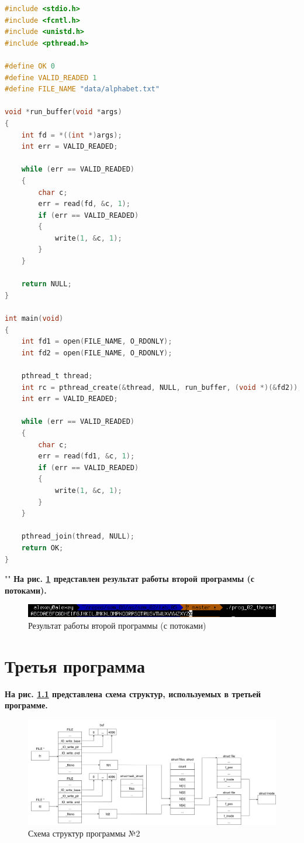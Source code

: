 \documentclass[12pt]{report}
\begin{document}
\begin{lstlisting}[language=c, label=p2thread, caption=Программа №2 (реализация с потоками)]
#include <stdio.h>
#include <fcntl.h>
#include <unistd.h>
#include <pthread.h>

#define OK 0
#define VALID_READED 1
#define FILE_NAME "data/alphabet.txt"

void *run_buffer(void *args)
{
	int fd = *((int *)args);
	int err = VALID_READED;
	
	while (err == VALID_READED)
	{
		char c;
		err = read(fd, &c, 1);
		if (err == VALID_READED)
		{
			write(1, &c, 1);
		}
	}

	return NULL;
}

int main(void)
{
	int fd1 = open(FILE_NAME, O_RDONLY);
	int fd2 = open(FILE_NAME, O_RDONLY);
	
	pthread_t thread;
	int rc = pthread_create(&thread, NULL, run_buffer, (void *)(&fd2));
	int err = VALID_READED;
	
	while (err == VALID_READED)
	{
		char c;
		err = read(fd1, &c, 1);
		if (err == VALID_READED)
		{
			write(1, &c, 1);
		}
	}
	
	pthread_join(thread, NULL);
	return OK;
}
\end{lstlisting}

""\newline
\textbf{На рис. \ref{fig:prog_02_thread} представлен результат работы второй программы (с потоками).}

\begin{figure}[H]
	\centering
	\includegraphics[scale=0.8]{img/prog_02_thread.png}
	\caption{Результат работы второй программы (с потоками)}
	\label{fig:prog_02_thread}
\end{figure}

\chapter{Третья программа}

\textbf{На рис. \ref{fig:prog_03_schema} представлена схема структур, используемых в третьей программе.}

\begin{figure}[H]
	\centering
	\includegraphics[scale=0.32]{img/prog_03_schema.jpg}
	\caption{Схема структур программы №2}
	\label{fig:prog_03_schema}
\end{figure}
\end{document}
